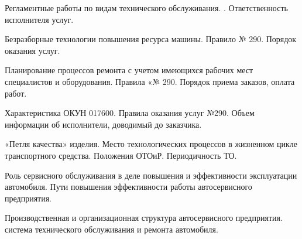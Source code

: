 \documentclass[
	14pt,
	a4paper,
	]
	{scrartcl}
\begin{document}
\vfill
\z Регламентные работы по видам технического обслуживания. 
 \vfill
{}. Ответственность исполнителя услуг.
 \vfill

\vfill

\newpage


\shapk
{}
\setcounter{zad}{0}

\vfill
\z Безразборные технологии повышения ресурса машины.
 \vfill
\z Правило № 290. Порядок оказания услуг.
 \vfill

\vfill

\newpage


\shapk
{}
\setcounter{zad}{0}

\vfill
\z Планирование процессов ремонта с учетом имеющихся рабочих мест специалистов и оборудования.
 \vfill
\z Правила «№ 290. Порядок приема заказов, оплата работ.
 \vfill

\vfill

\newpage


\shapk
{}
\setcounter{zad}{0}

\vfill
\z Характеристика ОКУН 017600.
 \vfill
\z Правила оказания услуг №290. Объем информации об исполнители, доводимый до заказчика.
 \vfill

\vfill

\newpage


\shapk
{}
\setcounter{zad}{0}

\vfill
\z «Петля качества» изделия. Место технологических процессов в жизненном цикле транспортного средства.
 \vfill
\z Положения ОТОиР. Периодичность ТО.
 \vfill

\vfill

\newpage


\shapk
{}
\setcounter{zad}{0}

\vfill
\z Роль сервисного обслуживания в деле повышения и эффективности эксплуатации автомобиля.
 \vfill
\z Пути повышения эффективности работы автосервисного предприятия.
 \vfill

\vfill

\newpage


\shapk
{}
\setcounter{zad}{0}

\vfill
\z Производственная и организационная структура автосервисного предприятия.
 \vfill
\z система технического обслуживания и ремонта автомобиля.
 \vfill

\vfill

\newpage
\end{document}
